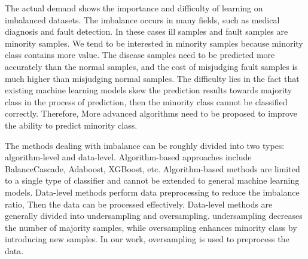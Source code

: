 \documentclass[ida]{iosart2x}
\begin{document}
The actual demand shows the importance and difficulty of learning on imbalanced datasets.
The imbalance occurs in many fields, such as medical 
diagnosis\cite{2013Computational,2019Electrocardiogram} and fault detection\cite{2018Imbalanced}.
In these cases ill samples and fault samples are minority samples.
We tend to be interested in minority samples because minority class contains more value. 
The disease samples need to be predicted more accurately than the normal samples, 
and the cost of misjudging fault samples is much higher than misjudging normal samples.
The difficulty %
lies in the fact that existing machine 
learning models skew the prediction results towards 
majority class in the process of prediction\cite{Victoria2013An}, then 
the minority class cannot be classified correctly\cite{2016A}. 
Therefore, More advanced algorithms need to 
be proposed to improve the ability to predict minority class.

The methods dealing with imbalance can be roughly
divided into two types: algorithm-level\cite{2007Highcost-sensitive} and data-level\cite{2002SMOTE}.
Algorithm-based approaches include BalanceCascade\cite{2019Class}, Adaboost, 
XGBoost\cite{Chen_2016}, etc. 
Algorithm-based methods are limited 
to a single type of classifier\cite{2020Combined} and 
cannot be extended to general machine learning models.
Data-level methods perform data preprocessing to reduce the imbalance ratio, Then 
the data can be processed effectively.
Data-level methods are generally divided into undersampling\cite{2015Undersampled} 
and oversampling\cite{2002SMOTE}. 
undersampling decreases the number of majority samples, %
while oversampling enhances minority class by introducing new samples\cite{2010A}.
In our work, oversampling is used to preprocess the data.
\end{document}
